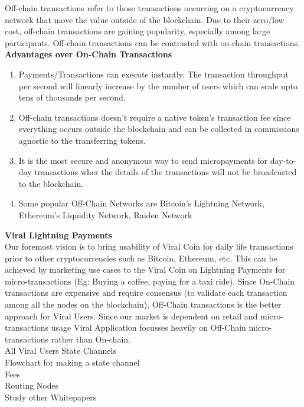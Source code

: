 \documentclass[10pt]{article}
\begin{document}
Off-chain transactions refer to those transactions occurring on a cryptocurrency network that move the value outside of the blockchain. Due to their zero/low cost, off-chain transactions are gaining popularity, especially among large participants. Off-chain transactions can be contrasted with on-chain transactions.\\

\textbf{Advantages over On-Chain Transactions}\\
\begin{enumerate}[leftmargin=+0.2in]
\item Payments/Transactions can execute instantly. The transaction throughput per second will linearly increase by the number of users which can scale upto tens of thousands per second.
\item Off-chain transactions doesn’t require a native token's transaction fee since everything occurs outside the blockchain and can be collected in commissions agnostic to the transferring tokens.
\item It is the most secure and anonymous way to send micropayments for day-to-day transactions wher the details of the transactions will not be broadcasted to the blockchain.
\item Some popular Off-Chain Networks are Bitcoin’s Lightning Network, Ethereum’s Liquidity Network, Raiden Network
\end{enumerate}

\textbf{Viral Lightning Payments}\\

Our foremost vision is to bring usability of Viral Coin for daily life transactions prior to other cryptocurrencies such as Bitcoin, Ethereum, etc. This can be achieved by marketing use cases to the Viral Coin on Lightning Payments for micro-transactions  (Eg: Buying a coffee, paying for a taxi ride). Since On-Chain transactions are expensive and require consensus (to validate each transaction among all the nodes on the blockchain), Off-Chain transactions is the better approach for Viral Users. Since our market is dependent on retail and micro-transactions usage Viral Application focusses heavily on Off-Chain micro-transactions rather than On-chain.\\

All Viral Users State Channels\\
Flowchart for making a state channel\\
Fees\\
Routing Nodes\\
Study other Whitepapers\\
\end{document}
